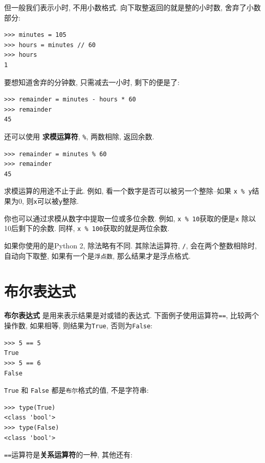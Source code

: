 \documentclass[10pt]{book}
\begin{document}
但一般我们表示小时, 不用小数格式. 
向下取整返回的就是整的小时数, 舍弃了小数部分:

\begin{verbatim}
>>> minutes = 105
>>> hours = minutes // 60
>>> hours
1
\end{verbatim}

要想知道舍弃的分钟数, 只需减去一小时, 剩下的便是了:

\begin{verbatim}
>>> remainder = minutes - hours * 60
>>> remainder
45
\end{verbatim}


还可以使用 {\bf 求模运算符},  \verb"%",  
两数相除, 返回余数. 

\begin{verbatim}
>>> remainder = minutes % 60
>>> remainder
45
\end{verbatim}
%
求模运算的用途不止于此. 例如, 看一个数字是否可以被另一个整除--如果
{\tt x \% y}结果为0, 则{\tt x}可以被{\tt y}整除.

你也可以通过求模从数字中提取一位或多位余数. 
例如,  {\tt x \% 10}获取的便是{\tt x} 除以10后剩下的余数. 
同样, {\tt x \% 100}获取的就是两位余数. 

如果你使用的是Python 2, 除法略有不同. 
其除法运算符, \verb"/",  会在两个整数相除时, 自动向下取整, 
如果有一个是{\tt 浮点数}, 那么结果才是浮点格式. 


\section{布尔表达式}

{\bf 布尔表达式} 是用来表示结果是对或错的表达式. 
下面例子使用运算符{\tt ==},  比较两个操作数, 
如果相等, 则结果为{\tt True}, 否则为{\tt False}:

\begin{verbatim}
>>> 5 == 5
True
>>> 5 == 6
False
\end{verbatim}
%
{\tt True} 和 {\tt False} 都是{\tt  布尔}格式的值, 不是字符串:

\begin{verbatim}
>>> type(True)
<class 'bool'>
>>> type(False)
<class 'bool'>
\end{verbatim}
%
 {\tt ==}运算符是{\bf 关系运算符}的一种, 其他还有:
\end{document}
